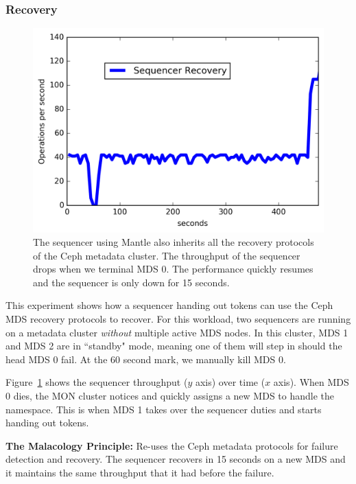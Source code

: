 \documentclass[10pt,twocolumn]{article}
\begin{document}
\subsubsection{Recovery}

\begin{figure}[t]
\centering
\includegraphics{figures/recovery-seq-thruput.png}
\caption{The sequencer using Mantle also inherits all the recovery protocols of
the Ceph metadata cluster. The throughput of the sequencer drops when we
terminal MDS 0. The performance quickly resumes and the sequencer is only down
for 15 seconds.}
\label{fig:recovery-seq-thruput}
\end{figure}

This experiment shows how a sequencer handing out tokens can use the Ceph MDS
recovery protocols to recover. For this workload, two sequencers are running on
a metadata cluster {\it without} multiple active MDS nodes. In this cluster,
MDS 1 and MDS 2 are in ``standby" mode, meaning one of them will step in should
the head MDS 0 fail. At the 60 second mark, we manually kill MDS 0. 

Figure~\ref{fig:recovery-seq-thruput} shows the sequencer throughput (\(y\)
axis) over time (\(x\) axis). When MDS 0 dies, the MON cluster notices and
quickly assigns a new MDS to handle the namespace. This is when MDS 1 takes
over the sequencer duties and starts handing out tokens.

\textbf{The Malacology Principle:} Re-uses the Ceph metadata protocols for
failure detection and recovery. The sequencer recovers in 15 seconds on a new
MDS and it maintains the same throughput that it had before the failure.
\end{document}
